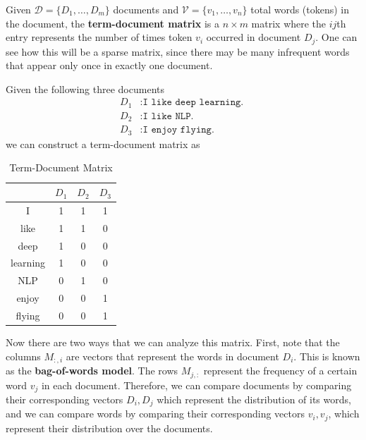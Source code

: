 \documentclass{article}
\begin{document}
      \begin{definition}
        Given $\mathcal{D} = \{D_1, \ldots, D_m\}$ documents and $\mathcal{V} = \{v_1, \ldots, v_n\}$ total words (tokens) in the document, the \textbf{term-document matrix} is a $n \times m$ matrix where the $ij$th entry represents the number of times token $v_i$ occurred in document $D_j$. One can see how this will be a sparse matrix, since there may be many infrequent words that appear only once in exactly one document. 
      \end{definition}

      \begin{example}
        Given the following three documents 
        \begin{align*}
            D_1 & : \texttt{I like deep learning. } \\
            D_2 & : \texttt{I like NLP. } \\
            D_3 & : \texttt{I enjoy flying.}
        \end{align*}
        we can construct a term-document matrix as 
        \begin{table}[H]
          \centering
          \begin{tabular}{|c||*{3}{c|}}
          \hline
           & $D_1$ & $D_2$ & $D_3$ \\ 
          \hline\hline
          I       & 1 & 1 & 1 \\ \hline
          like    & 1 & 1 & 0\\ \hline
          deep    & 1 & 0 & 0 \\ \hline
          learning& 1 & 0 & 0 \\ \hline
          NLP     & 0 & 1 & 0 \\ \hline
          enjoy   & 0 & 0 & 1 \\ \hline
          flying  & 0 & 0 & 1 \\ \hline
          \end{tabular}
          \caption{Term-Document Matrix}
        \end{table}
      \end{example}

      Now there are two ways that we can analyze this matrix. First, note that the columns $M_{:, i}$ are vectors that represent the words in document $D_i$. This is known as the \textbf{bag-of-words model}. The rows $M_{j, :}$ represent the frequency of a certain word $v_j$ in each document. Therefore, we can compare documents by comparing their corresponding vectors $D_i, D_j$ which represent the distribution of its words, and we can compare words by comparing their corresponding vectors $v_i, v_j$, which represent their distribution over the documents. 
\end{document}

